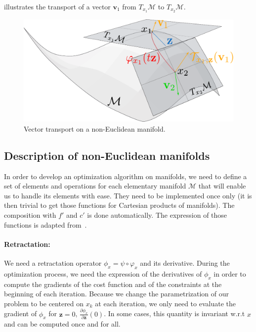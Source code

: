  illustrates the transport of a vector $\mathbf{v}_1$ from $T_{x_1}\mathcal{M}$ to $T_{x_2}\mathcal{M}$.

\begin{figure}[htpb]
  \centering
  \includegraphics[width=0.8\linewidth]{transport.pdf}
  \caption{Vector transport on a non-Euclidean manifold.}
\label{fig:transport}
\end{figure}


\subsection{Description of non-Euclidean manifolds}
\label{sub:examples_on_non_euclidean_manifolds}

In order to develop an optimization algorithm on manifolds, we need to define a set of elements and operations for each elementary manifold $\mathcal{M}$ that will enable us to handle its elements with ease.
They need to be implemented once only (it is then trivial to get those functions for Cartesian products of manifolds).
The composition with $f'$ and $c'$ is done automatically.
The expression of those functions is adapted from~\cite{boumal:jmlr:2014}.

\paragraph{Retractation:}
We need a retractation operator $\phi_x = \psi\circ\varphi_x$ and its derivative.
During the optimization process, we need the expression of the derivatives of $\phi_x$ in order to compute the gradients of the cost function and of the constraints at the beginning of each iteration.
Because we change the parametrization of our problem to be centered on $x_k$ at each iteration, we only need to evaluate the gradient of $\phi_x$ for $\mathbf{z}=0$, $\frac{\partial \phi_x}{\partial \mathbf{z}}(0)$.
In some cases, this quantity is invariant w.r.t $x$ and can be computed once and for all.

